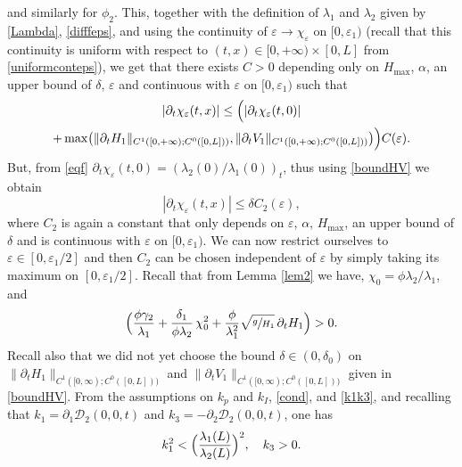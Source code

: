 and similarly for $\phi_{2}$. This, together with the definition of $\lambda_{1}$ and $\lambda_{2}$ given by \eqref{Lambda}, \eqref{difffeps}, and
using the continuity of $\varepsilon\to \chi_{\varepsilon}$ on $[0,\varepsilon_{1})$ (recall that this continuity is uniform with respect to $(t,x)\in[0,+\infty)\times[0,L]$ {from \eqref{uniformconteps}}),
we get that there exists $C>0$ depending only on $H_{\max}$, $\alpha$, {an upper bound of $\delta$,} $\varepsilon$ and continuous with $\varepsilon$ on $[0,\varepsilon_{1})$ such that\vspace*{-5pt}
\begin{multline*}
|\partial_{t}\chi_{\varepsilon}(t,x)|\leq \Bigl(|\partial_{t}\chi_{\varepsilon}(t,0)|\\
+ \max \bigl(\lVert\partial_{t}H_{1}\rVert_{C^{1}([0,+\infty);C^{0}([0,L]))},\lVert\partial_{t}V_{1}\rVert_{C^{1}([0,+\infty);C^{0}([0,L]))} \bigr) \Bigr)C(\varepsilon).
\end{multline*}
But, from \eqref{eqf} $\partial_{t}\chi_{\varepsilon}(t,0)=\left(\lambda_{2}{(0)}/\lambda_{1}{(0)}\right)_{t}$, thus
using \eqref{boundHV}
we obtain
\begin{equation}
|\partial_{t}\chi_{\varepsilon}(t,x)|\leq \delta C_{2}(\varepsilon),
\label{borne_dtfeps}
\end{equation}
where $C_{2}$ is again a constant that only depends on $\varepsilon$, $\alpha$, $H_{\max}$, {an upper bound of $\delta$} and is continuous with $\varepsilon$ on $[0,\varepsilon_{1})$.
We can now restrict ourselves to $\varepsilon\in[0,\varepsilon_{1}/2]$ and then $C_{2}$ can be chosen independent of $\varepsilon$ by simply taking its maximum on $[0,\varepsilon_{1}/2]$.
Recall that from Lemma \ref{lem2} we have, $\chi_{0}=\phi\lambda_{2}/\lambda_{1}$, and
\begin{equation*}
\Bigl(\frac{\phi\gamma_{2}}{\lambda_{1}}+\frac{\delta_{1}}{\phi\lambda_{2}}\,\chi_{0}^{2}+{\frac{\phi}{\lambda_{1}^{2}}}\sqrt{\sfrac{g}{H_{1}}}\,\partial_{t} H_{1} \Bigr)>0.
\end{equation*}
Recall {also} that we did not yet choose the bound $\delta\in(0,{\delta_{0}})$ on $\lVert\partial_{t}H_{1}\rVert_{C^{1}([0,\infty);C^{0}([0,L]))}$ and $\lVert\partial_{t}V_{1}\rVert_{C^{1}([0,\infty);C^{0}([0,L]))}$ given in \eqref{boundHV}.
From the assumptions on $k_{p}$ and $k_{I}$, \ie \eqref{cond}, and \eqref{k1k3}, {and recalling that $k_{1}=\partial_{1}\mathcal{D}_{2}(0,0,t)$
and $k_{3}=-\partial_{2}\mathcal{D}_{2}(0,0,t)$}, one has
\begin{equation}
k_{1}^{2}<\Bigl(\frac{\lambda_{1}(L)}{\lambda_{2}(L)} \Bigr)^{2},\quad k_{3}>0.
\label{condk1k3}
\end{equation}
